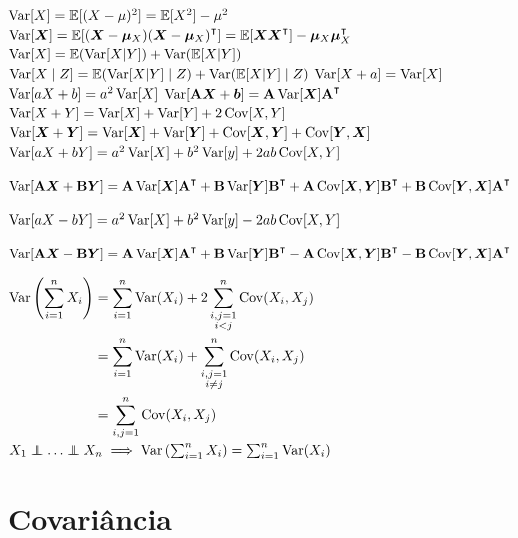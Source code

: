 \begin{theorem}
	\leavevmode
	\begin{outline}[enumerate]
		\1 \( \operatorname{Var}[X] = \operatorname{\mathbb{E}}[(X-\mu)^2] = \operatorname{\mathbb{E}}[X^2] - \mu^2\)
		\1 \( \Var[\v{X}] = \E[(\v{X}-\v{\mu}_X)(\v{X}-\v{\mu}_X)\T] = \E[\v{X}\v{X}\T] - \v{\mu}_{X}\v{\mu}_{X}\T \)
		\1 \( \operatorname{Var}[X] = \operatorname{\mathbb{E}}(\operatorname{Var}[X|Y]) + \operatorname{Var}(\operatorname{\mathbb{E}}[X|Y]) \)
		\1 \( \operatorname{Var}[X \mid Z] = \operatorname{\mathbb{E}}(\operatorname{Var}[X|Y]\mid Z) + \operatorname{Var}(\operatorname{\mathbb{E}}[X|Y] \mid Z) \)
		\1 \( \operatorname{Var}[X+a] = \operatorname{Var}[X] \)
		\1 \( \operatorname{Var}[aX+b] = a^2\operatorname{Var}[X] \)
		\1 \( \Var[\m{A}\v{X} + \v{b}] = \m{A}\Var[\v{X}]\m{A}\T \)
		\1 \( \operatorname{Var}[X+Y] = \operatorname{Var}[X]+\operatorname{Var}[Y]+ 2\operatorname{Cov}[X,Y] \)
		\1 \( \operatorname{Var}[\bm{X}+\bm{Y}] = \operatorname{Var}[\bm{X}]+\operatorname{Var}[\bm{Y}] + \operatorname{Cov}[\bm{X},\bm{Y}] +  \operatorname{Cov}[\bm{Y},\bm{X}] \)
		\1 \( \operatorname{Var}[aX+bY] = a^2\operatorname{Var}[X] + b^2\operatorname{Var}[y] + 2ab\operatorname{Cov}[X,Y] \)
		
		\1 \( \Var[\m{A}\v{X}+\m{B} \v{Y}] = \m{A}\Var[\v{X}]\m{A}\T + \m{B}\Var[\v{Y}]\m{B}\T + \m{A}\Cov[\v{X},\v{Y}]\m{B}\T + \m{B}\Cov[\v{Y},\v{X}]\m{A}\T \)
		
		\1 \( \operatorname{Var}[aX-bY] = a^2\operatorname{Var}[X] + b^2\operatorname{Var}[y] - 2ab\operatorname{Cov}[X,Y] \)
		
		\1 \( \Var[\m{A}\v{X} - \m{B} \v{Y}] = \m{A}\Var[\v{X}]\m{A}\T + \m{B}\Var[\v{Y}]\m{B}\T - \m{A}\Cov[\v{X},\v{Y}]\m{B}\T - \m{B}\Cov[\v{Y},\v{X}]\m{A}\T \)
		
		\1 \( \begin{aligned}[t] \operatorname{Var}\left(\sum_{i=1}^{n} X_i\right) &= \sum_{i=1}^{n} \operatorname{Var}(X_i) + 2\sum_{\substack{i,j=1\\i<j}}^{n} \operatorname{Cov}(X_i, X_j) \\
			&= \sum_{i=1}^{n} \operatorname{Var}(X_i) + \sum_{\substack{i,j=1\\i\neq j}}^{n} \operatorname{Cov}(X_i, X_j) \\
			&= \sum_{i,j=1}^{n} \operatorname{Cov}(X_i, X_j)
		\end{aligned} \)
		\1 \( X_1 \indep \ldots \indep X_n \implies \Var\left(\sum_{i=1}^{n} X_i\right) = \sum_{i=1}^{n} \Var(X_i) \)
		
	\end{outline}
\end{theorem}

\section{Covariância}

